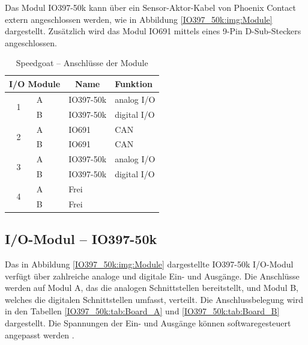 Das Modul IO397-50k kann über ein Sensor-Aktor-Kabel von Phoenix Contact extern angeschlossen werden, wie in Abbildung \ref{IO397_50k:img:Module} dargestellt.
Zusätzlich wird das Modul IO691 mittels eines 9-Pin D-Sub-Steckers angeschlossen.
\pagebreak[1]
\begin{table}[!ht]
	\centering
	\caption{Speedgoat – Anschlüsse der Module}
	\label{speedgoat:tab:Module}
	\begin{tabular}{clll}
		\hline
		\multicolumn{2}{c}{\textbf{I/O Module}} & \multicolumn{1}{c}{\textbf{Name}} & \textbf{Funktion}               \\ \hline
		\multirow{2}{*}{1}                      & \multicolumn{1}{l|}{A}            & IO397-50k         & analog I/O  \\
		                                        & \multicolumn{1}{l|}{B}            & IO397-50k         & digital I/O \\ \hline
		\multirow{2}{*}{2}                      & \multicolumn{1}{l|}{A}            & IO691             & CAN         \\
		                                        & \multicolumn{1}{l|}{B}            & IO691             & CAN         \\ \hline
		\multirow{2}{*}{3}                      & \multicolumn{1}{l|}{A}            & IO397-50k         & analog I/O  \\
		                                        & \multicolumn{1}{l|}{B}            & IO397-50k         & digital I/O \\ \hline
		\multirow{2}{*}{4}                      & \multicolumn{1}{l|}{A}            & Frei              &             \\
		                                        & \multicolumn{1}{l|}{B}            & Frei              &             \\ \hline
	\end{tabular}
\end{table}
\pagebreak[4]




\subsection{I/O-Modul – IO397-50k}
\label{section:IO397_50k}

Das in Abbildung \ref{IO397_50k:img:Module} dargestellte IO397-50k I/O-Modul verfügt über zahlreiche analoge und digitale Ein- und Ausgänge. Die Anschlüsse werden auf Modul A, das die analogen Schnittstellen bereitstellt, und Modul B, welches die digitalen Schnittstellen umfasst, verteilt. Die Anschlussbelegung wird in den Tabellen \ref{IO397_50k:tab:Board_A} und \ref{IO397_50k:tab:Board_B} dargestellt. Die Spannungen der Ein- und Ausgänge können softwaregesteuert angepasst werden \cite{speedgoat:IO397_50k}.

